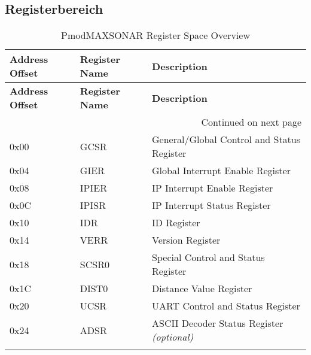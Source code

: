 \subsection{Registerbereich}
\begin{longtable}{|p{3cm}|p{3cm}|p{8cm}|}
    \hline
    \textbf{Address Offset} & \textbf{Register Name} & \textbf{Description} \\
    \hline
    \endfirsthead
    \hline
    \textbf{Address Offset} & \textbf{Register Name} & \textbf{Description} \\
    \hline
    \endhead
    \hline \multicolumn{3}{|r|}{{Continued on next page}} \\ \hline
    \endfoot
    \hline
    \endlastfoot

    0x00 & GCSR & General/Global Control and Status Register \\
    \hline
    0x04 & GIER & Global Interrupt Enable Register \\
    \hline
    0x08 & IPIER & IP Interrupt Enable Register \\
    \hline
    0x0C & IPISR & IP Interrupt Status Register \\
    \hline
    0x10 & IDR & ID Register \\
    \hline
    0x14 & VERR & Version Register \\
    \hline
    0x18 & SCSR0 & Special Control and Status Register \\
    \hline
    0x1C & DIST0 & Distance Value Register \\
    \hline
    0x20 & UCSR & UART Control and Status Register \\
    \hline
    0x24 & ADSR & ASCII Decoder Status Register \textit{(optional)}\\
    \hline
    \caption{PmodMAXSONAR Register Space Overview}
    \label{tab:register_overview}
    \end{longtable}

